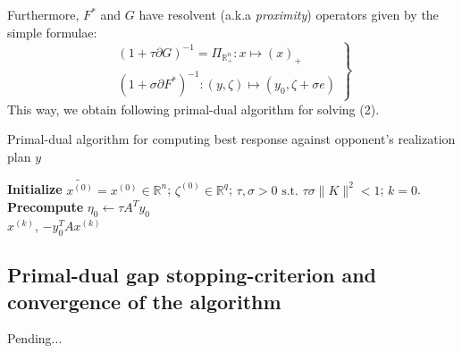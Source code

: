 \documentclass[a4paper,10pt,journal]{IEEEtran}
\newtheorem*{remark}{Remark}
\begin{document}
Furthermore, $F^*$ and $G$ have resolvent (a.k.a \textit{proximity}) operators given by the simple formulae:
\begin{equation}
  \left.
  \begin{aligned}
    (1 + \tau \partial G)^{-1} = \Pi_{\mathbb{R}_+^n}: x \mapsto (x)_+\\
    (1 + \sigma \partial F^*)^{-1}: (y, \zeta) \mapsto (y_0, \zeta + \sigma e)
  \end{aligned}
  \right\}
\end{equation}
This way, we obtain following primal-dual algorithm for solving (2).

\begin{algorithm}[htb]
\caption{Primal-dual algorithm for computing best response against opponent's realization plan $y$}%
\textbf{Initialize} $\tilde{x^{(0)}} = x^{(0)} \in \mathbb{R}^n$; $\zeta^{(0)} \in \mathbb{R}^{q}$;
$\tau, \sigma > 0 \text{ s.t. }\tau\sigma \|K\|^2 < 1$; $k = 0$.\\
\textbf{Precompute} $\eta_0 \leftarrow \tau A^Ty_0$\\
 \Return $x^{(k)}$, $-y_0^TAx^{(k)}$
\label{Tab:pseudocode_lbfgs}
\end{algorithm}

\subsection{Primal-dual gap stopping-criterion and convergence of the algorithm}
Pending...

\end{document}
